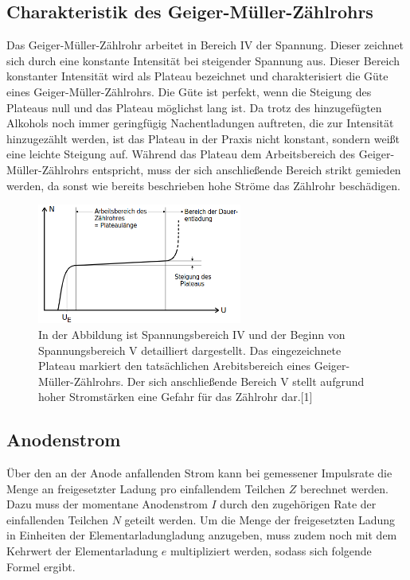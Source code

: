 \documentclass[titlepage = firstcover]{scrartcl}
\begin{document}
                \FloatBarrier
            

        \subsection{Charakteristik des Geiger-Müller-Zählrohrs}
            Das Geiger-Müller-Zählrohr arbeitet in Bereich IV der Spannung. Dieser zeichnet sich durch eine konstante Intensität bei steigender Spannung aus. Dieser Bereich konstanter Intensität
            wird als Plateau bezeichnet und charakterisiert die Güte eines Geiger-Müller-Zählrohrs. Die Güte ist perfekt, wenn die Steigung des Plateaus null und das Plateau möglichst lang ist. Da 
            trotz des hinzugefügten Alkohols noch immer geringfügig Nachentladungen auftreten, die zur Intensität hinzugezählt werden, ist das Plateau in der Praxis nicht konstant, sondern weißt eine 
            leichte Steigung auf. Während das Plateau dem Arbeitsbereich des Geiger-Müller-Zählrohrs entspricht, muss der sich anschließende Bereich strikt gemieden werden, da sonst wie bereits 
            beschrieben hohe Ströme das Zählrohr beschädigen.

            \FloatBarrier

            \begin{figure}[h]
              \centering
              \includegraphics[width = 0.6\textwidth]{Bilder/SchemaCharakteristik.png}
              \caption{In der Abbildung ist Spannungsbereich IV und der Beginn von Spannungsbereich V detailliert dargestellt. Das eingezeichnete Plateau markiert den tatsächlichen Arebitsbereich eines Geiger-Müller-Zählrohrs. Der sich anschließende Bereich V stellt aufgrund hoher Stromstärken eine Gefahr für das Zählrohr dar.[1]}
              \label{fig:SchemaCharakteristik}
            \end{figure}

            \FloatBarrier

        \subsection{Anodenstrom}
            Über den an der Anode anfallenden Strom kann bei gemessener Impulsrate die Menge an freigesetzter Ladung pro einfallendem Teilchen $Z$ berechnet werden. Dazu muss der momentane Anodenstrom
            $I$ durch den zugehörigen Rate der einfallenden Teilchen $N$ geteilt werden. Um die Menge der freigesetzten Ladung in Einheiten der Elementarladungladung anzugeben, muss zudem noch 
            mit dem Kehrwert der Elementarladung $e$ multipliziert werden, sodass sich folgende Formel ergibt.
\end{document}
